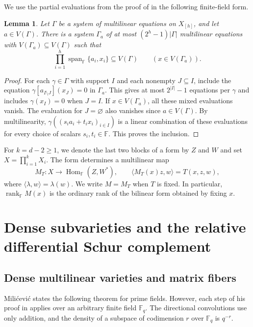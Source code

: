 \documentclass[11pt,reqno]{amsart}
\theoremstyle{plain}
\newtheorem{lemma}[theorem]{Lemma}
\theoremstyle{definition}
\newcommand{\F}{\mathbb F}
\DeclareMathOperator{\Hom}{Hom}
\DeclareMathOperator{\rk}{rank}
\begin{document}
We use the partial evaluations from the proof of
\cite[Theorem~1.2, \S3.2]{ChenYe} in the following finite-field form.
\begin{lemma}\label{lem:refine}
Let $\Gamma$ be a system of multilinear equations on $X_{[h]}$, and let
$a\in V(\Gamma)$. There is a system $\Gamma_a$ of at most
$(2^h-1)|\Gamma|$ multilinear equations with $V(\Gamma_a)\subseteq
V(\Gamma)$ such that
\[
 \prod_{i=1}^h \operatorname{span}_{\F}\{a_i,x_i\}\subseteq V(\Gamma)
 \qquad(x\in V(\Gamma_a)).
\]
\end{lemma}
\begin{proof}
For each $\gamma\in\Gamma$ with support $I$ and each nonempty $J\subseteq I$, include the equation
$\gamma[a_{I\setminus J}](x_J)=0$ in $\Gamma_a$.
This gives at most $2^{|I|}-1$ equations per $\gamma$ and includes
$\gamma(x_I)=0$ when $J=I$. If $x\in V(\Gamma_a)$, all these mixed
evaluations vanish. The evaluation for $J=\varnothing$ also vanishes
since $a\in V(\Gamma)$. By multilinearity,
$\gamma((s_i a_i+t_i x_i)_{i\in I})$ is a linear combination of these
evaluations for every choice of scalars $s_i,t_i\in\F$. This proves the inclusion.
\end{proof}

For $k=d-2\geq1$, we denote the last two blocks of a form by $Z$ and $W$ and set $X=\prod_{i=1}^kX_i$. The form determines a multilinear map
\[
 M_T\colon X\longrightarrow\Hom_{\F}(Z,W^*),\qquad
 \langle M_T(x)z,w\rangle=T(x,z,w),
\]
where $\langle\lambda,w\rangle=\lambda(w)$. We write $M=M_T$ when $T$ is fixed.
In particular, $\rk_{\F}M(x)$ is the ordinary rank of the bilinear form obtained by fixing $x$.
\section{Dense subvarieties and the relative differential Schur complement}\label{sec:input}
\subsection{Dense multilinear varieties and matrix fibers}\label{sec:density}
Mili\'cevi\'c states the following theorem for prime fields. However, each step
of his proof in \cite[\S\S2--3]{Milicevic} applies over an arbitrary
finite field $\F_q$. The directional convolutions use only addition,
and the density of a subspace of codimension $r$ over $\F_q$ is $q^{-r}$.
\end{document}
